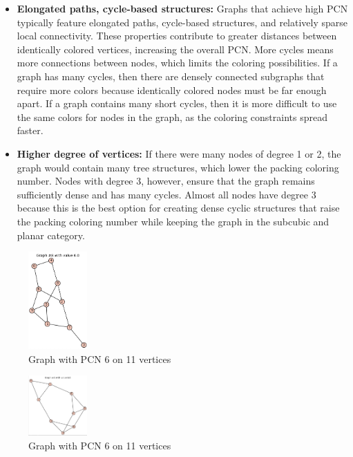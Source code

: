 \documentclass[12pt,a4paper]{amsart}
\theoremstyle{definition}
\theoremstyle{plain}
\begin{document}
\begin{itemize}
    \item \textbf{Elongated paths, cycle-based structures:} Graphs that achieve high PCN typically feature elongated paths, cycle-based structures, 
    and relatively sparse local connectivity. These properties contribute to greater distances between identically colored vertices, increasing 
    the overall PCN. More cycles means more connections between nodes, which limits the coloring possibilities. If a graph has many cycles, 
    then there are densely connected subgraphs that require more colors because identically colored nodes must be far enough apart. If a graph 
    contains many short cycles, then it is more difficult to use the same colors for nodes in the graph, as the coloring constraints spread faster.

    \item \textbf{Higher degree of vertices:} If there were many nodes of degree 1 or 2, the graph would contain many tree structures, which lower the packing coloring 
    number. Nodes with degree 3, however, ensure that the graph remains sufficiently dense and has many cycles. Almost all nodes have degree 3 because this is the best option for creating dense cyclic structures that raise the packing 
    coloring number while keeping the graph in the subcubic and planar category.
\end{itemize}

\begin{figure}[h]
    \centering
    \includegraphics[width=0.2\textwidth]{Images/Screenshot 2025-01-31 at 23.25.16}
    \caption{Graph with PCN 6 on 11 vertices}
    \label{fig:screenshot1}
\end{figure}

\begin{figure}[h]
    \centering
    \includegraphics[width=0.2\textwidth]{Images/Screenshot 2025-01-31 at 23.23.59}
    \caption{Graph with PCN 6 on 11 vertices}
    \label{fig:screenshot2}
\end{figure}
\end{document}
